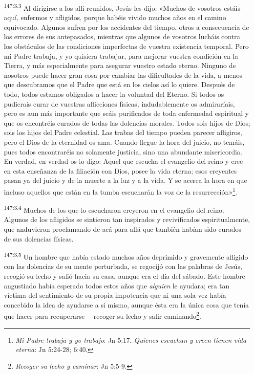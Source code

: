 \par 
\textsuperscript{147:3.3} Al dirigirse a los allí reunidos, Jesús les dijo: «Muchos de vosotros estáis aquí, enfermos y afligidos, porque habéis vivido muchos años en el camino equivocado. Algunos sufren por los accidentes del tiempo, otros a consecuencia de los errores de sus antepasados, mientras que algunos de vosotros lucháis contra los obstáculos de las condiciones imperfectas de vuestra existencia temporal. Pero mi Padre trabaja, y yo quisiera trabajar, para mejorar vuestra condición en la Tierra, y más especialmente para asegurar vuestro estado eterno. Ninguno de nosotros puede hacer gran cosa por cambiar las dificultades de la vida, a menos que descubramos que el Padre que está en los cielos así lo quiere. Después de todo, todos estamos obligados a hacer la voluntad del Eterno. Si todos os pudierais curar de vuestras aflicciones físicas, indudablemente os admiraríais, pero es aun más importante que seáis purificados de toda enfermedad espiritual y que os encontréis curados de todas las dolencias morales. Todos sois hijos de Dios; sois los hijos del Padre celestial. Las trabas del tiempo pueden parecer afligiros, pero el Dios de la eternidad os ama. Cuando llegue la hora del juicio, no temáis, pues todos encontraréis no solamente justicia, sino una abundante misericordia. En verdad, en verdad os lo digo: Aquel que escucha el evangelio del reino y cree en esta enseñanza de la filiación con Dios, posee la vida eterna; esos creyentes pasan ya del juicio y de la muerte a la luz y a la vida. Y se acerca la hora en que incluso aquellos que están en la tumba escucharán la voz de la resurrección»\footnote{\textit{Mi Padre trabaja y yo trabajo}: Jn 5:17. \textit{Quienes escuchan y creen tienen vida eterna}: Jn 5:24-28; 6:40.}.

\par 
\textsuperscript{147:3.4} Muchos de los que lo escucharon creyeron en el evangelio del reino. Algunos de los afligidos se sintieron tan inspirados y revivificados espiritualmente, que anduvieron proclamando de acá para allá que también habían sido curados de sus dolencias físicas.

\par 
\textsuperscript{147:3.5} Un hombre que había estado muchos años deprimido y gravemente afligido con las dolencias de su mente perturbada, se regocijó con las palabras de Jesús, recogió su lecho y salió hacia su casa, aunque era el día del sábado. Este hombre angustiado había esperado todos estos años que \textit{alguien} le ayudara; era tan víctima del sentimiento de su propia impotencia que ni una sola vez había concebido la idea de ayudarse a sí mismo, aunque ésta era la única cosa que tenía que hacer para recuperarse ---recoger su lecho y salir caminando\footnote{\textit{Recoger su lecho y caminar}: Jn 5:5-9.}.

